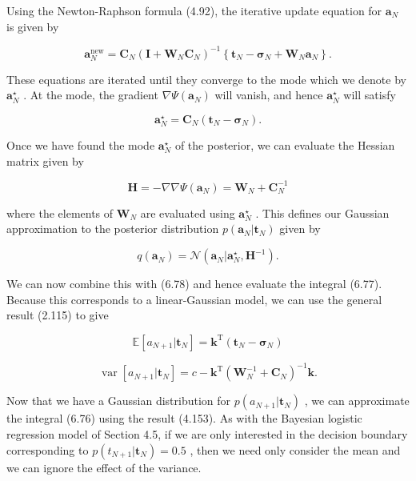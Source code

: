 \documentclass[
  10
]{article}
\begin{document}
Using the Newton-Raphson formula (4.92), the iterative update equation
for \(\mathbf { a } _ { N }\) is given by

\[
\mathbf {a} _ {N} ^ {\mathrm{new}} = \mathbf {C} _ {N} (\mathbf {I} + \mathbf {W} _ {N} \mathbf {C} _ {N}) ^ {- 1} \left\{\mathbf {t} _ {N} - \pmb {\sigma} _ {N} + \mathbf {W} _ {N} \mathbf {a} _ {N} \right\}.\tag{6.83}
\]

These equations are iterated until they converge to the mode which we
denote by \(\mathbf { a } _ { N } ^ { \star }\) . At the mode, the
gradient \(\nabla \Psi ( { \mathbf a } _ { N } )\) will vanish, and
hence \(\mathbf { a } _ { N } ^ { \star }\) will satisfy

\[
\mathbf {a} _ {N} ^ {\star} = \mathbf {C} _ {N} (\mathbf {t} _ {N} - \boldsymbol {\sigma} _ {N}).\tag{6.84}
\]

Once we have found the mode \(\mathbf { a } _ { N } ^ { \star }\) of the
posterior, we can evaluate the Hessian matrix given by

\[
\mathbf {H} = - \nabla \nabla \Psi (\mathbf {a} _ {N}) = \mathbf {W} _ {N} + \mathbf {C} _ {N} ^ {- 1}\tag{6.85}
\]

where the elements of \(\mathbf { W } _ { N }\) are evaluated using
\(\mathbf { a } _ { N } ^ { \star }\) . This defines our Gaussian
approximation to the posterior distribution
\(p ( \mathbf { a } _ { N } | \mathbf { t } _ { N } )\) given by

\[
q (\mathbf {a} _ {N}) = \mathcal {N} (\mathbf {a} _ {N} | \mathbf {a} _ {N} ^ {\star}, \mathbf {H} ^ {- 1}).\tag{6.86}
\]

We can now combine this with (6.78) and hence evaluate the integral
(6.77). Because this corresponds to a linear-Gaussian model, we can use
the general result (2.115) to give

\[
\mathbb {E} [ a _ {N + 1} | \mathbf {t} _ {N} ] = \mathbf {k} ^ {\mathrm{T}} (\mathbf {t} _ {N} - \boldsymbol {\sigma} _ {N})\tag{6.87}
\]

\[
\operatorname{var} [ a _ {N + 1} | \mathbf {t} _ {N} ] = c - \mathbf {k} ^ {\mathrm{T}} (\mathbf {W} _ {N} ^ {- 1} + \mathbf {C} _ {N}) ^ {- 1} \mathbf {k}.\tag{6.88}
\]

Now that we have a Gaussian distribution for
\(p ( a _ { N + 1 } | \mathbf { t } _ { N } )\) , we can approximate the
integral (6.76) using the result (4.153). As with the Bayesian logistic
regression model of Section 4.5, if we are only interested in the
decision boundary corresponding to
\(p ( t _ { N + 1 } | \mathbf { t } _ { N } ) = 0 . 5\) , then we need
only consider the mean and we can ignore the effect of the variance.
\end{document}
